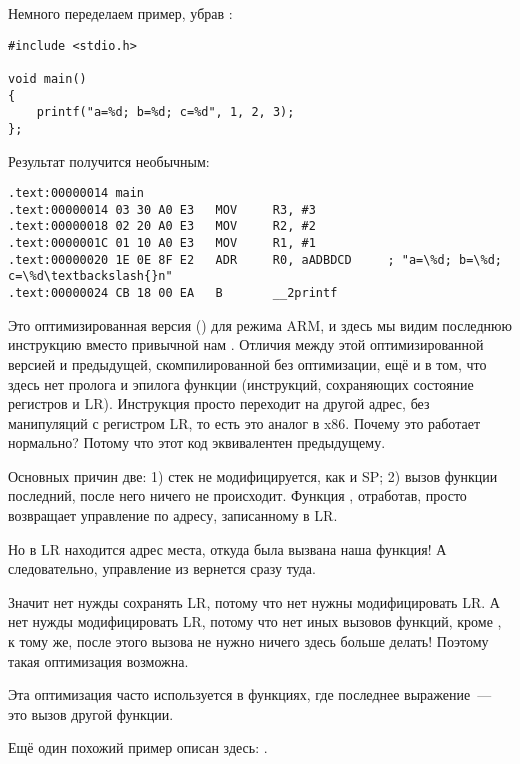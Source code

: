 Немного переделаем пример, убрав :

\begin{lstlisting}[style=customc]
#include <stdio.h>

void main()
{
	printf("a=%d; b=%d; c=%d", 1, 2, 3);
};
\end{lstlisting}

Результат получится необычным:

\begin{lstlisting}[caption=\OptimizingKeilVI (\ARMMode),style=customasmARM]
.text:00000014 main
.text:00000014 03 30 A0 E3   MOV     R3, #3
.text:00000018 02 20 A0 E3   MOV     R2, #2
.text:0000001C 01 10 A0 E3   MOV     R1, #1
.text:00000020 1E 0E 8F E2   ADR     R0, aADBDCD     ; "a=\%d; b=\%d; c=\%d\textbackslash{}n"
.text:00000024 CB 18 00 EA   B       __2printf
\end{lstlisting}

Это оптимизированная версия (\Othree) для режима ARM, и здесь мы видим последнюю инструкцию 
 вместо привычной нам .
Отличия между этой оптимизированной версией и предыдущей, скомпилированной без оптимизации, 
ещё и в том, что здесь нет пролога и эпилога функции (инструкций, сохраняющих состояние регистров  и \ac{LR}).
Инструкция  просто переходит на другой адрес, без манипуляций с регистром \ac{LR}, то есть это аналог \JMP в x86.
Почему это работает нормально? Потому что этот код эквивалентен предыдущему.

Основных причин две: 1) стек не модифицируется, как и  \ac{SP}; 2) вызов функции \printf последний, после него ничего не происходит.
Функция \printf, отработав, просто возвращает управление по адресу, записанному в \ac{LR}.

Но в \ac{LR} находится адрес места, откуда была вызвана наша функция!
А следовательно, управление из \printf вернется сразу туда.

Значит нет нужды сохранять \ac{LR}, потому что нет нужны модифицировать \ac{LR}.
А нет нужды модифицировать \ac{LR}, потому что нет иных вызовов функций, кроме \printf, к тому же, после этого вызова не нужно ничего здесь больше делать!
Поэтому такая оптимизация возможна.

Эта оптимизация часто используется в функциях, где последнее выражение~--- это вызов другой функции.

Ещё один похожий пример описан здесь:
.

